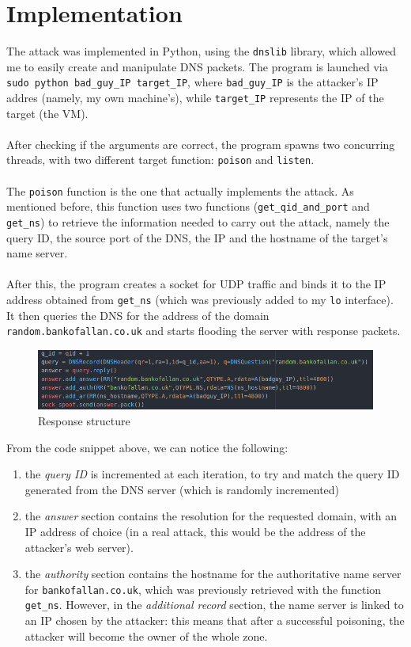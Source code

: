 \documentclass[a4paper]{article}
\begin{document}
\section{Implementation}
	The attack was implemented in Python, using the \texttt{dnslib} library, which allowed me to easily create and manipulate DNS packets. The program is launched via \texttt{sudo python bad\_guy\_IP target\_IP}, where \texttt{bad\_guy\_IP} is the attacker's IP addres (namely, my own machine's), while \texttt{target\_IP} represents the IP of the target (the VM).\\
	\\After checking if the arguments are correct, the program spawns two concurring threads, with two different target function: \texttt{poison} and \texttt{listen}.\\
	\\The \texttt{poison} function is the one that actually implements the attack. As mentioned before, this function uses two functions (\texttt{get\_qid\_and\_port} and \texttt{get\_ns}) to retrieve the information needed to carry out the attack, namely the query ID, the source port of the DNS, the IP and the hostname of the target's name server.\\
	\\After this, the program creates a socket for UDP traffic and binds it to the IP address obtained from \texttt{get\_ns} (which was previously added to my \texttt{lo} interface). It then queries the DNS for the address of the domain \texttt{random.bankofallan.co.uk} and starts flooding the server with response packets.
	\begin{figure}[H]
		\centering
		\includegraphics[width=1\linewidth]{response_flooding}
		\caption{Response structure}
		\label{fig:responseflooding}
	\end{figure}
	From the code snippet above, we can notice the following:
	\begin{enumerate}
		\item the \textit{query ID} is incremented at each iteration, to try and match the query ID generated from the DNS server (which is randomly incremented)
		\item the \textit{answer} section contains the resolution for the requested domain, with an IP address of choice (in a real attack, this would be the address of the attacker's web server).
		\item the \textit{authority} section contains the hostname for the authoritative name server for \texttt{bankofallan.co.uk}, which was previously retrieved with the function \texttt{get\_ns}. However, in the \textit{additional record} section, the name server is linked to an IP chosen by the attacker: this means that after a successful poisoning, the attacker will become the owner of the whole zone.
	\end{enumerate}
\end{document}
